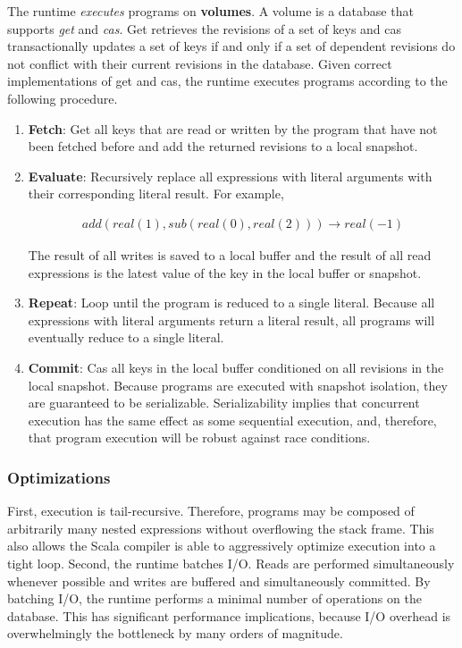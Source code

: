 \documentclass[12pt]{article}
\begin{document}
The runtime \emph{executes} programs on \textbf{volumes}. A volume is a database that supports
\emph{get} and \emph{cas}. Get retrieves the revisions of a set of keys and cas transactionally
updates a set of keys if and only if a set of dependent revisions do not conflict with their
current revisions in the database. Given correct implementations of get and cas, the runtime
executes programs according to the following procedure.

\begin{enumerate}
\item \textbf{Fetch}: Get all keys that are read or written by the program that have not been
fetched before and add the returned revisions to a local snapshot.
\item \textbf{Evaluate}: Recursively replace all expressions with literal arguments with their
corresponding literal result. For example,

\[
\begin{gathered}
add(real(1), sub(real(0), real(2))) \rightarrow real(-1)
\end{gathered}
\]

The result of all writes is saved to a local buffer and the result of all read
expressions is the latest value of the key in the local buffer or snapshot.
\item \textbf{Repeat}: Loop until the program is reduced to a single literal. Because all
expressions with literal arguments return a literal result, all programs will eventually
reduce to a single literal.
\item \textbf{Commit}: Cas all keys in the local buffer conditioned on all revisions in
the local snapshot. Because programs are executed with snapshot isolation, they are
guaranteed to be serializable. Serializability implies that concurrent execution has the
same effect as some sequential execution, and, therefore, that program execution will be
robust against race conditions.
\end{enumerate}

\subsubsection{Optimizations}
First, execution is tail-recursive. Therefore, programs may be composed of arbitrarily many
nested expressions without overflowing the stack frame. This also allows the Scala compiler is
able to aggressively optimize execution into a tight loop. Second, the runtime batches I/O.
Reads are performed simultaneously whenever possible and writes are buffered and simultaneously
committed. By batching I/O, the runtime performs a minimal number of operations on the database.
This has significant performance implications, because I/O overhead is overwhelmingly the
bottleneck by many orders of magnitude. \cite{io}
\end{document}
